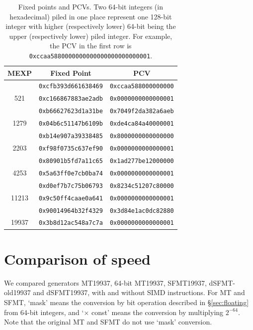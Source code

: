 \documentclass{svmult}
\begin{document}
\begin{table}
  \begin{center}
    \caption{Fixed points and PCVs.
      Two 64-bit integers (in hexadecimal) piled in one place represent one 128-bit
      integer with higher (respectively lower) 64-bit being the upper
      (respectively lower) piled integer. For example, the PCV in the first
      row is \texttt{0xccaa5880000000000000000000000001}.
    }
    \label{tab:pcv}
    \begin{tabular}{c||c|c} \hline
      MEXP & Fixed Point %
      & PCV \\ \hline \hline %
      & \texttt{0xcfb393d661638469} & \texttt{0xccaa588000000000} \\
      521 & \texttt{0xc166867883ae2adb} &\texttt{0x0000000000000001} \\ \hline
      & \texttt{0xb66627623d1a31be} & \texttt{0x7049f2da382a6aeb} \\
      1279 & \texttt{0x04b6c51147b6109b} & \texttt{0xde4ca84a40000001} \\ \hline
      & \texttt{0xb14e907a39338485} & \texttt{0x8000000000000000} \\
      2203 & \texttt{0xf98f0735c637ef90} & \texttt{0x0000000000000001} \\ \hline
      & \texttt{0x80901b5fd7a11c65} & \texttt{0x1ad277be12000000} \\
      4253 & \texttt{0x5a63ff0e7cb0ba74} & \texttt{0x0000000000000001} \\ \hline
      & \texttt{0xd0ef7b7c75b06793} & \texttt{0x8234c51207c80000} \\
      11213 & \texttt{0x9c50ff4caae0a641} & \texttt{0x0000000000000001}\\ \hline
      & \texttt{0x90014964b32f4329} & \texttt{0x3d84e1ac0dc82880} \\
      19937 & \texttt{0x3b8d12ac548a7c7a} & \texttt{0x0000000000000001} \\
      \hline
    \end{tabular}
  \end{center}
\end{table}

\section{Comparison of speed}\label{sec:comp-speed}
We compared generators MT19937, 64-bit MT19937, SFMT19937,
 dSFMT-old19937 and dSFMT19937, with and
without SIMD instructions. For MT and SFMT, `mask' means the
conversion by bit operation described in \S\ref{sec:floating} from
 64-bit integers, %
and `$\times$ const' means the
conversion by multiplying $2^{-64}$. Note that the original MT and SFMT
do not use `mask' conversion.
\end{document}
